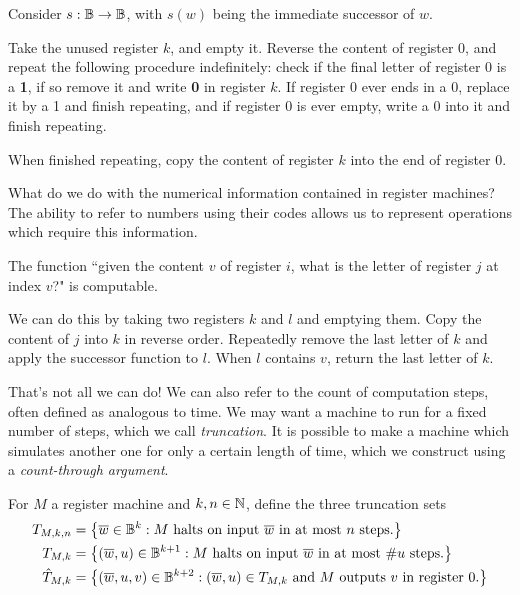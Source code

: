 \documentclass{article}
\begin{document}
\begin{prf}
	Consider $s : \mathbb{B} \to \mathbb{B}$, with $s(w)$ being the immediate successor of $w$.
	    
	Take the unused register $k$, and empty it. Reverse the content of register 0, and repeat the following procedure indefinitely: check if the final letter of register 0 is a \textbf{1}, if so remove it and write \textbf{0} in register $k$. If register 0 ever ends in a 0, replace it by a 1 and finish repeating, and if register 0 is ever empty, write a 0 into it and finish repeating.
	    
	When finished repeating, copy the content of register $k$ into the end of register 0.
\end{prf}

What do we do with the numerical information contained in register machines? The ability to refer to numbers using their codes allows us to represent operations which require this information.

\begin{proposition}
	The function ``given the content $v$ of register $i$, what is the letter of register $j$ at index $v$?" is computable.
\end{proposition}

\begin{prf}
	We can do this by taking two registers $k$ and $l$ and emptying them. Copy the content of $j$ into $k$ in reverse order. Repeatedly remove the last letter of $k$ and apply the successor function to $l$. When $l$ contains $v$, return the last letter of $k$.
\end{prf}

That's not all we can do! We can also refer to the count of computation steps, often defined as analogous to time. We may want a machine to run for a fixed number of steps, which we call \textit{truncation}. It is possible to make a machine which simulates another one for only a certain length of time, which we construct using a \textit{count-through argument}.

\begin{definition}
	For $M$ a register machine and $k, n \in \mathbb{N}$, define the three truncation sets
	\begin{align*}
		T_{M,k,n}    & = \left\lbrace \overline w \in \mathbb{B}^k : \text{$M$ halts on input $\overline w$ in at most $n$ steps.} \right\rbrace                        \\
		T_{M,k}      & = \left\lbrace (\overline w, u) \in \mathbb{B}^{k+1} : \text{$M$ halts on input $\overline w$ in at most $\# u$ steps.} \right\rbrace            \\
		\hat T_{M,k} & = \left\lbrace (\overline w, u, v) \in \mathbb{B}^{k+2} : \text{$(\overline w, u) \in T_{M,k}$ and $M$ outputs $v$ in register 0.} \right\rbrace 
	\end{align*}
\end{definition}
\end{document}
